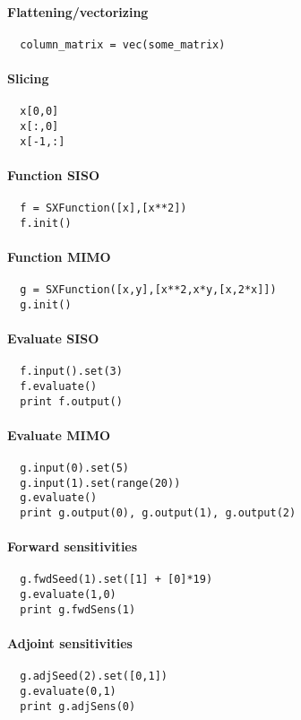 \documentclass[a4paper,8pt,twocolumn]{article}
\begin{document}
\paragraph{Flattening/vectorizing}
\begin{verbatim}
  column_matrix = vec(some_matrix)
\end{verbatim}

\paragraph{Slicing}
\begin{verbatim}
  x[0,0]
  x[:,0]
  x[-1,:]
\end{verbatim}

\paragraph{Function SISO}

\begin{verbatim}
  f = SXFunction([x],[x**2])
  f.init()
\end{verbatim}

\paragraph{Function MIMO}
\begin{verbatim}
  g = SXFunction([x,y],[x**2,x*y,[x,2*x]])
  g.init()
\end{verbatim}

\paragraph{Evaluate SISO}

\begin{verbatim}
  f.input().set(3)
  f.evaluate()
  print f.output()
\end{verbatim}

\paragraph{Evaluate MIMO}
\begin{verbatim}
  g.input(0).set(5)
  g.input(1).set(range(20))
  g.evaluate()
  print g.output(0), g.output(1), g.output(2)
\end{verbatim}

\paragraph{Forward sensitivities}

\begin{verbatim}
  g.fwdSeed(1).set([1] + [0]*19)
  g.evaluate(1,0)
  print g.fwdSens(1)
\end{verbatim}

\paragraph{Adjoint sensitivities}

\begin{verbatim}
  g.adjSeed(2).set([0,1])
  g.evaluate(0,1)
  print g.adjSens(0)
\end{verbatim}
\end{document}
